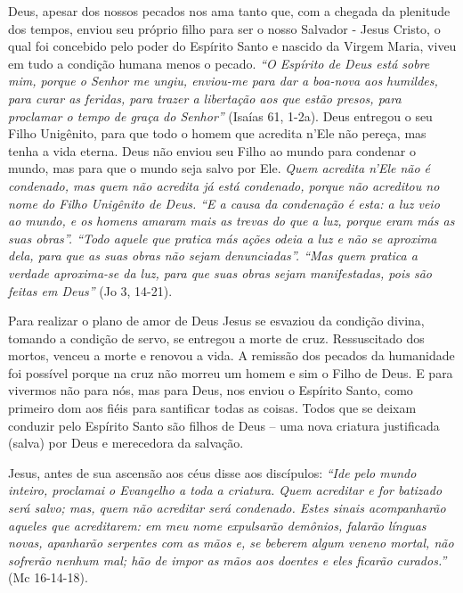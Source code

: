 \documentclass[
]{book}
\begin{document}
Deus, apesar dos nossos pecados nos ama tanto que, com a chegada da plenitude dos tempos, enviou seu próprio filho para ser o nosso Salvador - Jesus Cristo, o qual foi concebido pelo poder do Espírito Santo e nascido da Virgem Maria, viveu em tudo a condição humana menos o pecado. \emph{``O Espírito de Deus está sobre mim, porque o Senhor me ungiu, enviou-me para dar a boa-nova aos humildes, para curar as feridas, para trazer a libertação aos que estão presos, para proclamar o tempo de graça do Senhor''} (Isaías 61, 1-2a). Deus entregou o seu Filho Unigênito, para que todo o homem que acredita n'Ele não pereça, mas tenha a vida eterna. Deus não enviou seu Filho ao mundo para condenar o mundo, mas para que o mundo seja salvo por Ele. \emph{Quem acredita n'Ele não é condenado, mas quem não acredita já está condenado, porque não acreditou no nome do Filho Unigênito de Deus. ``E a causa da condenação é esta: a luz veio ao mundo, e os homens amaram mais as trevas do que a luz, porque eram más as suas obras''. ``Todo aquele que pratica más ações odeia a luz e não se aproxima dela, para que as suas obras não sejam denunciadas''. ``Mas quem pratica a verdade aproxima-se da luz, para que suas obras sejam manifestadas, pois são feitas em Deus''} (Jo 3, 14-21).

Para realizar o plano de amor de Deus Jesus se esvaziou da condição divina, tomando a condição de servo, se entregou a morte de cruz. Ressuscitado dos mortos, venceu a morte e renovou a vida. A remissão dos pecados da humanidade foi possível porque na cruz não morreu um homem e sim o Filho de Deus. E para vivermos não para nós, mas para Deus, nos enviou o Espírito Santo, como primeiro dom aos fiéis para santificar todas as coisas. Todos que se deixam conduzir pelo Espírito Santo são filhos de Deus -- uma nova
criatura justificada (salva) por Deus e merecedora da salvação.

Jesus, antes de sua ascensão aos céus disse aos discípulos: \emph{``Ide pelo mundo inteiro, proclamai o Evangelho a toda a criatura. Quem acreditar e for batizado será salvo; mas, quem não acreditar será condenado. Estes sinais acompanharão aqueles que acreditarem: em meu nome expulsarão demônios, falarão línguas novas, apanharão serpentes com as mãos e, se beberem algum veneno mortal, não sofrerão nenhum mal; hão de impor as mãos aos doentes e eles ficarão curados.''} (Mc 16-14-18).
\end{document}
